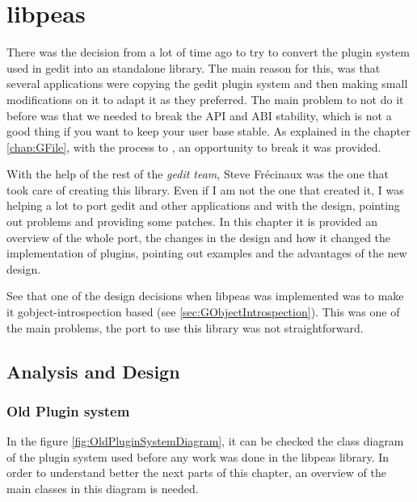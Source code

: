 
\chapter{libpeas}

There was the decision from a lot of time ago to try to convert the plugin system used in gedit into an standalone library. The main reason for this, was that several applications were copying the gedit plugin system and then making small modifications on it to adapt it as they preferred. The main problem to not do it before was that we needed to break the API and ABI stability, which is not a good thing if you want to keep your user base stable. As explained in the chapter \ref{chap:GFile}, with the process to , an opportunity to break it was provided.

With the help of the rest of the \emph{gedit team}, Steve Fr\'ecinaux was the one that took care of creating this library. Even if I am not the one that created it, I was helping a lot to port gedit and other applications and with the design, pointing out problems and providing some patches. In this chapter it is provided an overview of the whole port, the changes in the design and how it changed the implementation of plugins, pointing out examples and the advantages of the new design.

See that one of the design decisions when libpeas was implemented was to make it gobject-introspection based (see \ref{sec:GObjectIntrospection}). This was one of the main problems, the port to use this library was not straightforward.

\section{Analysis and Design}

\subsection{Old Plugin system}\label{sec:OldPluginSystem}


In the figure \ref{fig:OldPluginSystemDiagram}, it can be checked the class diagram of the plugin system used before any work was done in the libpeas library. In order to understand better the next parts of this chapter, an overview of the main classes in this diagram is needed.

